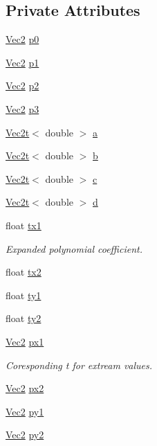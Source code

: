 \subsection*{Private Attributes}
\begin{DoxyCompactItemize}
\item 
\hyperlink{vec_8h_a871640c4eb6057d21b25824c55250629}{Vec2} \hyperlink{classBezier3_a61297313c61fc20a334b12603f59b999}{p0}
\item 
\hyperlink{vec_8h_a871640c4eb6057d21b25824c55250629}{Vec2} \hyperlink{classBezier3_acad9cdcdafe19feef1002ced52099cfe}{p1}
\item 
\hyperlink{vec_8h_a871640c4eb6057d21b25824c55250629}{Vec2} \hyperlink{classBezier3_aa78aee06abc3a06c2dd636df4fe4451d}{p2}
\item 
\hyperlink{vec_8h_a871640c4eb6057d21b25824c55250629}{Vec2} \hyperlink{classBezier3_a0e1e35eb084266b2dcd71ecf9b19b80f}{p3}
\item 
\hyperlink{structVec2t}{Vec2t}$<$ double $>$ \hyperlink{classBezier3_ae83be4ce590bf7a7a2bf53adeeb170cf}{a}
\item 
\hyperlink{structVec2t}{Vec2t}$<$ double $>$ \hyperlink{classBezier3_ad63b9a75228af1727b61fe032f7e2f68}{b}
\item 
\hyperlink{structVec2t}{Vec2t}$<$ double $>$ \hyperlink{classBezier3_aafb4270797f10af53a7feba1a66d59a0}{c}
\item 
\hyperlink{structVec2t}{Vec2t}$<$ double $>$ \hyperlink{classBezier3_a5ce0d6743e932b0096b64804324dad9b}{d}
\item 
float \hyperlink{classBezier3_ac017ccb0ddaadd93fcb65e144abfab64}{tx1}
\begin{DoxyCompactList}\small\item\em Expanded polynomial coefficient. \end{DoxyCompactList}\item 
float \hyperlink{classBezier3_a167a03a8686c66095e36c86b1ce2eef0}{tx2}
\item 
float \hyperlink{classBezier3_ad4f47c85e457139bd3f9e344b72309c1}{ty1}
\item 
float \hyperlink{classBezier3_aa956edaaef544c1ef270a0e5f9e333f2}{ty2}
\item 
\hyperlink{vec_8h_a871640c4eb6057d21b25824c55250629}{Vec2} \hyperlink{classBezier3_a7d69e4d349bbe7a7351188d2c0a3ef4b}{px1}
\begin{DoxyCompactList}\small\item\em Coresponding t for extream values. \end{DoxyCompactList}\item 
\hyperlink{vec_8h_a871640c4eb6057d21b25824c55250629}{Vec2} \hyperlink{classBezier3_ae439178d68735ec771c72d097cb90997}{px2}
\item 
\hyperlink{vec_8h_a871640c4eb6057d21b25824c55250629}{Vec2} \hyperlink{classBezier3_a6bdba56f87b7c2f2fd32361cd0cccdc8}{py1}
\item 
\hyperlink{vec_8h_a871640c4eb6057d21b25824c55250629}{Vec2} \hyperlink{classBezier3_affcc44acee6b341088cdd403c55fa61e}{py2}
\end{DoxyCompactItemize}


